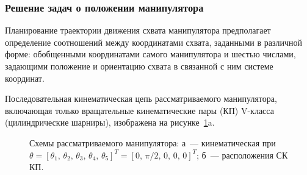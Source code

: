 \subsubsection{Решение задач о положении манипулятора}\label{part_kinematic_position}
Планирование траектории движения схвата манипулятора предполагает определение соотношений между координатами схвата, заданными в различной форме: обобщенными координатами самого манипулятора и шестью числами, задающими положение и ориентацию схвата в связанной с ним системе координат.

Последовательная кинематическая цепь рассматриваемого манипулятора, включающая только вращательные кинематические пары (КП) V-класса (цилиндрические шарниры), изображена на рисунке~\ref{img:kinematics}a.

\begin{figure}[h!]
	\begin{minipage}[h]{0.5\linewidth}
	\end{minipage}
	\hfill
	\begin{minipage}[h]{0.5\linewidth}
	\end{minipage}
	\caption{Схемы рассматриваемого манипулятора: а~--- кинематическая при $\theta=\left[\theta_1,\,\theta_2,\,\theta_3,\,\theta_4,\,\theta_5\right]^T = \left[0,\,\pi/2,\,0,\,0,\,0\right]^T$; б~--- расположения СК КП.}
	\label{img:kinematics}
\end{figure}

